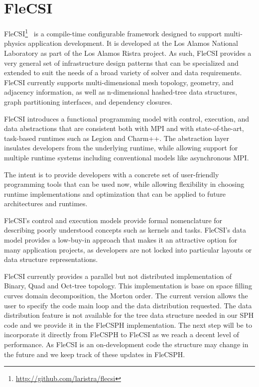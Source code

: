 \section{FleCSI}

FleCSI\footnote{\url{http://github.com/laristra/flecsi}}~\cite{bergen2016flexible} is a compile-time configurable framework designed to support multi-physics application development. 
It is developed at the Los Alamos National Laboratory as part of the Los Alamos Ristra project. 
As such, FleCSI provides a very general set of infrastructure design patterns that can be specialized and extended to suit the needs of a broad variety of solver and data requirements. 
FleCSI currently supports multi-dimensional mesh topology, geometry, and adjacency information, as well as n-dimensional hashed-tree data structures, graph partitioning interfaces, and dependency closures.

FleCSI introduces a functional programming model with control, execution, and data abstractions that are consistent both with MPI and with state-of-the-art, task-based runtimes such as Legion\cite{bauer2012legion} and Charm++\cite{kale1993charm++}. 
The abstraction layer insulates developers from the underlying runtime, while allowing support for multiple runtime systems including conventional models like asynchronous MPI.

The intent is to provide developers with a concrete set of user-friendly programming tools that can be used now, while allowing flexibility in choosing runtime implementations and optimization that can be applied to future architectures and runtimes.

FleCSI's control and execution models provide formal nomenclature for describing poorly understood concepts such as kernels and tasks. 
FleCSI's data model provides a low-buy-in approach that makes it an attractive option for many application projects, as developers are not locked into particular layouts or data structure representations.

FleCSI currently provides a parallel but not distributed implementation of Binary, Quad and Oct-tree topology. 
This implementation is base on space filling curves domain decomposition, the Morton order. 
The current version allows the user to specify the code main loop and the data distribution requested. 
The data distribution feature is not available for the tree data structure needed in our SPH code and we provide it in the FleCSPH implementation. 
The next step will be to incorporate it directly from FleCSPH to FleCSI as we reach a decent level of performance.
As FleCSI is an on-development code the structure may change in the future and we keep track of these updates in FleCSPH.

